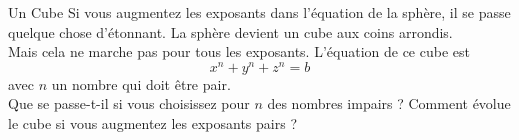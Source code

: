 \begin{surferPage}[Cube]{Un Cube}
Si vous augmentez les exposants dans l'équation de la sphère, il se passe quelque chose d'étonnant. La sphère devient un cube aux coins arrondis.\\
\vspace{0.3cm}
Mais cela ne marche pas pour tous les exposants. L'équation de ce cube est
\[x^n+y^n+z^n=b\]
avec $n$ un nombre qui doit être pair.\\
\vspace{0.3cm}
Que se passe-t-il si vous choisissez pour $n$ des nombres impairs ? Comment évolue le cube si vous augmentez les exposants pairs ?
\end{surferPage}
